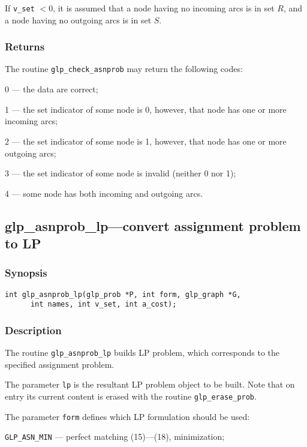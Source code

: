 \noindent
If \verb|v_set| $<0$, it is assumed that a node having no incoming arcs
is in set $R$, and a node having no outgoing arcs is in set $S$.

\subsubsection*{Returns}

The routine \verb|glp_check_asnprob| may return the following codes:

0 --- the data are correct;

1 --- the set indicator of some node is 0, however, that node has one
or more incoming arcs;

2 --- the set indicator of some node is 1, however, that node has one
or more outgoing arcs;

3 --- the set indicator of some node is invalid (neither 0 nor 1);

4 --- some node has both incoming and outgoing arcs.

\subsection{glp\_asnprob\_lp---convert assignment problem to LP}

\subsubsection*{Synopsis}

\begin{verbatim}
int glp_asnprob_lp(glp_prob *P, int form, glp_graph *G,
      int names, int v_set, int a_cost);
\end{verbatim}

\subsubsection*{Description}

The routine \verb|glp_asnprob_lp| builds LP problem, which corresponds
to the specified assignment problem.

The parameter \verb|lp| is the resultant LP problem object to be built.
Note that on entry its current content is erased with the routine
\verb|glp_erase_prob|.

The parameter \verb|form| defines which LP formulation should be used:

\verb|GLP_ASN_MIN| --- perfect matching (15)---(18), minimization;

